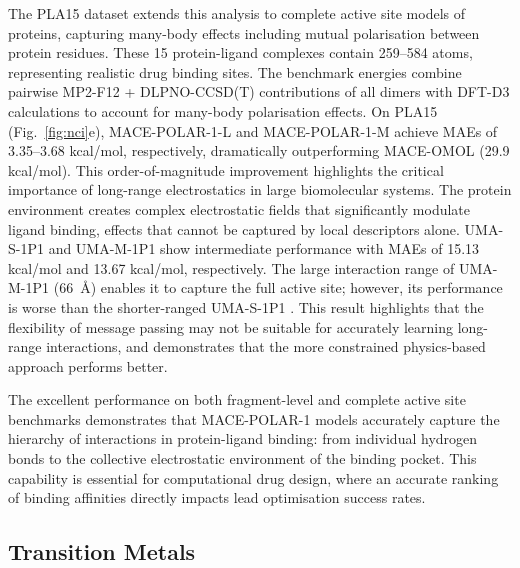 \documentclass[aps,%
superscriptaddress,
 amsmath,amssymb,
floatfix,
twocolumn
]{revtex4-2}
\newcommand{\MOMOL}{MACE-OMOL }
\newcommand{\MFP}{MACE-POLAR-1 }
\newcommand{\MFPM}{MACE-POLAR-1-M }
\newcommand{\MFPL}{MACE-POLAR-1-L }
\newcommand{\UMAS}{UMA-S-1P1 }
\newcommand{\UMAM}{UMA-M-1P1 }
\begin{document}
The PLA15 dataset extends this analysis to complete active site models of proteins, capturing many-body effects including mutual polarisation between protein residues. These 15 protein-ligand complexes contain 259--584 atoms, representing realistic drug binding sites. The benchmark energies combine pairwise MP2-F12 + DLPNO-CCSD(T) contributions of all dimers with DFT-D3 calculations to account for many-body polarisation effects.
On PLA15 (Fig.~\ref{fig:nci}e), \MFPL and \MFPM achieve MAEs of 3.35--3.68 kcal/mol, respectively, dramatically outperforming \MOMOL (29.9 kcal/mol). This order-of-magnitude improvement highlights the critical importance of long-range electrostatics in large biomolecular systems. The protein environment creates complex electrostatic fields that significantly modulate ligand binding, effects that cannot be captured by local descriptors alone. \UMAS and \UMAM show intermediate performance with MAEs of 15.13 kcal/mol and 13.67 kcal/mol, respectively. The large interaction range of \UMAM (66~\AA) enables it to capture the full active site; however, its performance is worse than the shorter-ranged \UMAS. This result highlights that the flexibility of message passing may not be suitable for accurately learning long-range interactions, and demonstrates that the more constrained physics-based approach performs better.

The excellent performance on both fragment-level and complete active site benchmarks demonstrates that \MFP models accurately capture the hierarchy of interactions in protein-ligand binding: from individual hydrogen bonds to the collective electrostatic environment of the binding pocket. This capability is essential for computational drug design, where an accurate ranking of binding affinities directly impacts lead optimisation success rates.



\subsection{Transition Metals}
\end{document}
